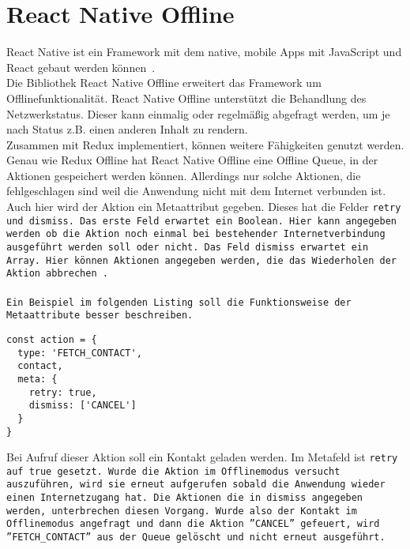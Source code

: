\section{React Native Offline}
React Native ist ein Framework mit dem native, mobile Apps mit JavaScript und React gebaut werden können~\cite{rn}.\\
Die Bibliothek React Native Offline erweitert das Framework um Offlinefunktionalität.
React Native Offline unterstützt die Behandlung des Netzwerkstatus.
Dieser kann einmalig oder regelmäßig abgefragt werden, um je nach Status z.B. einen anderen Inhalt zu rendern.\\
Zusammen mit Redux implementiert, können weitere Fähigkeiten genutzt werden.
Genau wie Redux Offline hat React Native Offline eine Offline \gls{Queue}, in der Aktionen gespeichert werden können.
Allerdings nur solche Aktionen, die fehlgeschlagen sind weil die Anwendung nicht mit dem Internet verbunden ist.
Auch hier wird der Aktion ein Metaattribut gegeben. Dieses hat die Felder \tt{retry} und \tt{dismiss}.
Das erste Feld erwartet ein Boolean. Hier kann angegeben werden ob die Aktion noch einmal bei bestehender Internetverbindung ausgeführt werden soll oder nicht.
Das Feld \tt{dismiss} erwartet ein Array. Hier können Aktionen angegeben werden, die das Wiederholen der Aktion abbrechen~\cite{rn-offline-gh}.\\\\
Ein Beispiel im folgenden Listing soll die Funktionsweise der Metaattribute besser beschreiben.
%
\begin{lstlisting}
const action = {
  type: 'FETCH_CONTACT',
  contact,
  meta: {
    retry: true,
    dismiss: ['CANCEL']
  }
}
\end{lstlisting}
%
Bei Aufruf dieser Aktion soll ein Kontakt geladen werden.
Im Metafeld ist \tt{retry} auf \tt{true} gesetzt.
Wurde die Aktion im Offlinemodus versucht auszuführen, wird sie erneut aufgerufen sobald die Anwendung wieder einen Internetzugang hat.
Die Aktionen die in \tt{dismiss} angegeben werden, unterbrechen diesen Vorgang.
Wurde also der Kontakt im Offlinemodus angefragt und dann die Aktion ''CANCEL'' gefeuert, wird ''FETCH\_CONTACT'' aus der Queue gelöscht und nicht erneut ausgeführt.
